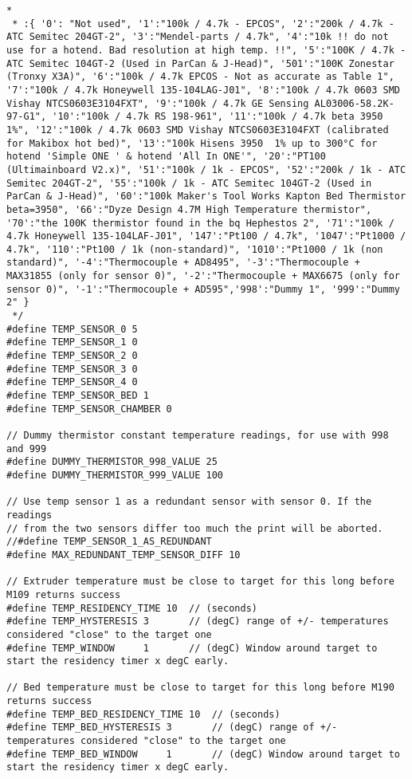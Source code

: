 \begin{lstlisting}[caption = キャプション, label = ラベル]
 *
 * :{ '0': "Not used", '1':"100k / 4.7k - EPCOS", '2':"200k / 4.7k - ATC Semitec 204GT-2", '3':"Mendel-parts / 4.7k", '4':"10k !! do not use for a hotend. Bad resolution at high temp. !!", '5':"100K / 4.7k - ATC Semitec 104GT-2 (Used in ParCan & J-Head)", '501':"100K Zonestar (Tronxy X3A)", '6':"100k / 4.7k EPCOS - Not as accurate as Table 1", '7':"100k / 4.7k Honeywell 135-104LAG-J01", '8':"100k / 4.7k 0603 SMD Vishay NTCS0603E3104FXT", '9':"100k / 4.7k GE Sensing AL03006-58.2K-97-G1", '10':"100k / 4.7k RS 198-961", '11':"100k / 4.7k beta 3950 1%", '12':"100k / 4.7k 0603 SMD Vishay NTCS0603E3104FXT (calibrated for Makibox hot bed)", '13':"100k Hisens 3950  1% up to 300°C for hotend 'Simple ONE ' & hotend 'All In ONE'", '20':"PT100 (Ultimainboard V2.x)", '51':"100k / 1k - EPCOS", '52':"200k / 1k - ATC Semitec 204GT-2", '55':"100k / 1k - ATC Semitec 104GT-2 (Used in ParCan & J-Head)", '60':"100k Maker's Tool Works Kapton Bed Thermistor beta=3950", '66':"Dyze Design 4.7M High Temperature thermistor", '70':"the 100K thermistor found in the bq Hephestos 2", '71':"100k / 4.7k Honeywell 135-104LAF-J01", '147':"Pt100 / 4.7k", '1047':"Pt1000 / 4.7k", '110':"Pt100 / 1k (non-standard)", '1010':"Pt1000 / 1k (non standard)", '-4':"Thermocouple + AD8495", '-3':"Thermocouple + MAX31855 (only for sensor 0)", '-2':"Thermocouple + MAX6675 (only for sensor 0)", '-1':"Thermocouple + AD595",'998':"Dummy 1", '999':"Dummy 2" }
 */
#define TEMP_SENSOR_0 5
#define TEMP_SENSOR_1 0
#define TEMP_SENSOR_2 0
#define TEMP_SENSOR_3 0
#define TEMP_SENSOR_4 0
#define TEMP_SENSOR_BED 1
#define TEMP_SENSOR_CHAMBER 0

// Dummy thermistor constant temperature readings, for use with 998 and 999
#define DUMMY_THERMISTOR_998_VALUE 25
#define DUMMY_THERMISTOR_999_VALUE 100

// Use temp sensor 1 as a redundant sensor with sensor 0. If the readings
// from the two sensors differ too much the print will be aborted.
//#define TEMP_SENSOR_1_AS_REDUNDANT
#define MAX_REDUNDANT_TEMP_SENSOR_DIFF 10

// Extruder temperature must be close to target for this long before M109 returns success
#define TEMP_RESIDENCY_TIME 10  // (seconds)
#define TEMP_HYSTERESIS 3       // (degC) range of +/- temperatures considered "close" to the target one
#define TEMP_WINDOW     1       // (degC) Window around target to start the residency timer x degC early.

// Bed temperature must be close to target for this long before M190 returns success
#define TEMP_BED_RESIDENCY_TIME 10  // (seconds)
#define TEMP_BED_HYSTERESIS 3       // (degC) range of +/- temperatures considered "close" to the target one
#define TEMP_BED_WINDOW     1       // (degC) Window around target to start the residency timer x degC early.


\end{lstlisting}
